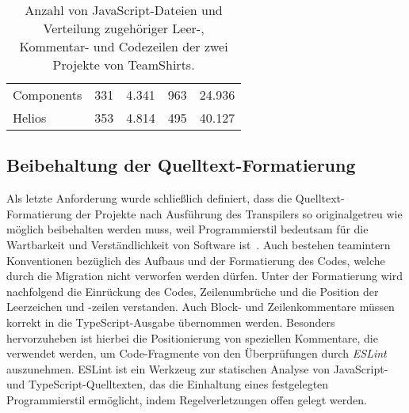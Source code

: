 \bigbreak
\begin{table}[tbh]
  \footnotesize
  \begin{tabu} to 
    \midrule
     &  &  &  &   \\
    \midrule
    Components & 331 & 4.341 & 963 & 24.936 \\
    Helios & 353 & 4.814 & 495 & 40.127 \\
    \midrule
  \end{tabu}
  \caption{Anzahl von JavaScript-Dateien und Verteilung zugehöriger Leer-, Kommentar- und Codezeilen der zwei Projekte von TeamShirts.}
  \label{tab:projects-loc}
\end{table}

\subsection{Beibehaltung der Quelltext-Formatierung}
\label{subsec:requirement:format}

Als letzte Anforderung wurde schließlich definiert, dass die Quelltext-Formatierung der Projekte nach Ausführung des Transpilers so originalgetreu wie möglich beibehalten werden muss, weil Programmierstil bedeutsam für die Wartbarkeit und Verständlichkeit von Software ist~\autocite[146]{KERNIGHAN:1982}. Auch bestehen teamintern Konventionen bezüglich des Aufbaus und der Formatierung des Codes, welche durch die Migration nicht verworfen werden dürfen. Unter der Formatierung wird nachfolgend die Einrückung des Codes, Zeilenumbrüche und die Position der Leerzeichen und -zeilen verstanden. Auch Block- und Zeilenkommentare müssen korrekt in die TypeScript-Ausgabe übernommen werden. Besonders hervorzuheben ist hierbei die Positionierung von speziellen Kommentare, die verwendet werden, um Code-Fragmente von den Überprüfungen durch \textit{ESLint}~\autocite{ESLINT} auszunehmen. ESLint ist ein Werkzeug zur statischen Analyse von JavaScript- und TypeScript-Quelltexten, das die Einhaltung eines festgelegten Programmierstil ermöglicht, indem Regelverletzungen offen gelegt werden.
